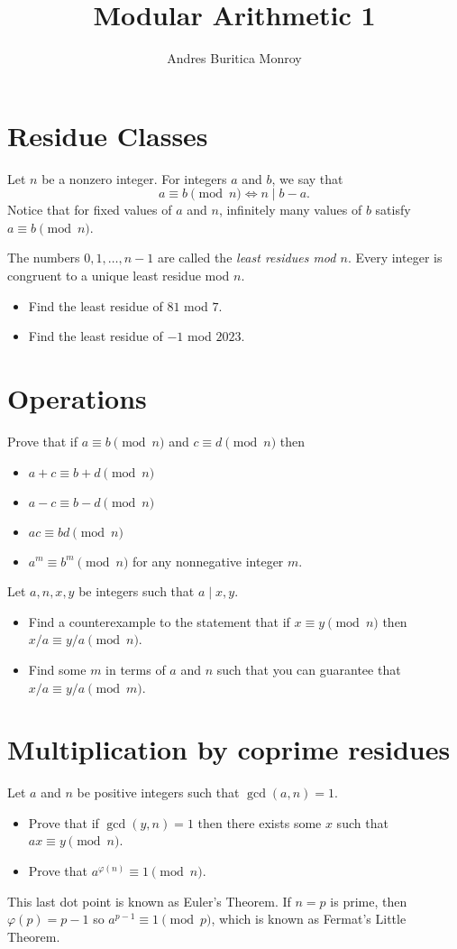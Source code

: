 \documentclass{article}
\title{Modular Arithmetic 1}
\author{Andres Buritica Monroy}
\date{}
\begin{document}
\maketitle
\section{Residue Classes}
Let $n$ be a nonzero integer. For integers $a$ and $b$, we say that
\[a\equiv b\pmod n\iff n\mid b-a.\]
Notice that for fixed values of $a$ and $n$, infinitely many values of $b$
satisfy $a\equiv b\pmod n$.

The numbers $0,1,\ldots,n-1$ are called the \emph{least residues mod $n$}.
Every integer is congruent to a unique least residue mod $n$.
\begin{itemize}
	\item Find the least residue of $81$ mod $7$.
	\item Find the least residue of $-1$ mod $2023$.
\end{itemize}
\section{Operations}
Prove that if $a\equiv b\pmod n$ and $c\equiv d\pmod n$ then
\begin{itemize}
	\item $a+c\equiv b+d\pmod n$
	\item $a-c\equiv b-d\pmod n$
	\item $ac\equiv bd\pmod n$
	\item $a^m\equiv b^m\pmod n$ for any nonnegative integer $m$.
\end{itemize}
Let $a,n,x,y$ be integers such that $a\mid x,y$.
\begin{itemize}
	\item Find a counterexample to the statement that if $x\equiv y\pmod n$ then $x/a\equiv
		      y/a\pmod n$.
	\item Find some $m$ in terms of $a$ and $n$ such that you can guarantee that
	      $x/a\equiv y/a\pmod m$.
\end{itemize}
\section{Multiplication by coprime residues}
Let $a$ and $n$ be positive integers such that $\gcd(a,n)=1$.
\begin{itemize}
	\item Prove that if $\gcd(y,n)=1$ then there exists some $x$ such that
	      $ax\equiv y\pmod n$.
	\item Prove that $a^{\varphi(n)}\equiv 1\pmod n$.
\end{itemize}
This last dot point is known as Euler's
Theorem. If $n=p$ is prime, then $\varphi(p)=p-1$ so $a^{p-1}\equiv 1\pmod
	p$, which is known as Fermat's Little Theorem.
\end{document}
